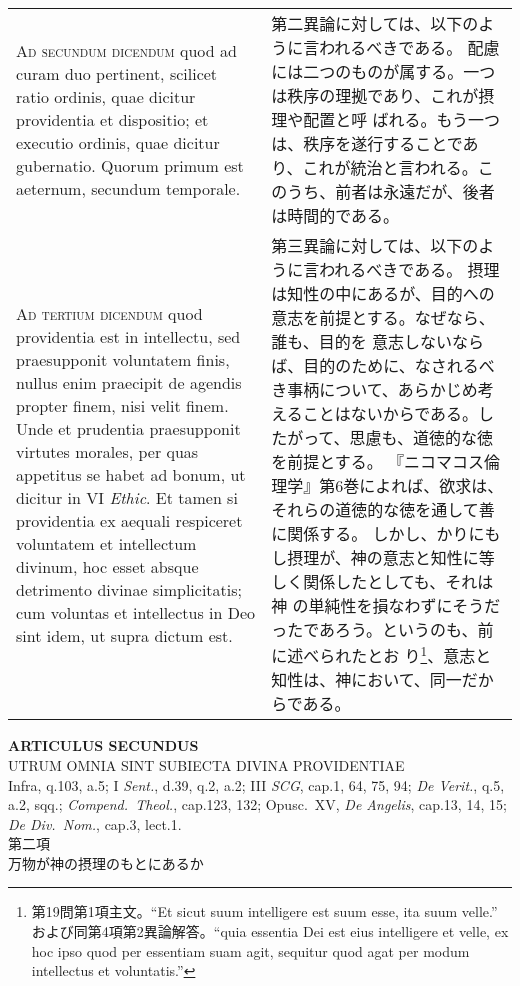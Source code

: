 \documentclass[10pt]{jsarticle} %
\begin{document}
\begin{longtable}{p{21em}p{21em}}
\\


{\scshape Ad secundum dicendum} quod ad curam duo
pertinent, scilicet ratio ordinis, quae dicitur providentia et
dispositio; et executio ordinis, quae dicitur gubernatio. Quorum primum
est aeternum, secundum temporale.


&

第二異論に対しては、以下のように言われるべきである。
配慮には二つのものが属する。一つは秩序の理拠であり、これが摂理や配置と呼
 ばれる。もう一つは、秩序を遂行することであり、これが統治と言われる。こ
 のうち、前者は永遠だが、後者は時間的である。


\\


{\scshape Ad tertium dicendum} quod providentia est in
intellectu, sed praesupponit voluntatem finis, nullus enim praecipit de
agendis propter finem, nisi velit finem. Unde et prudentia praesupponit
virtutes morales, per quas appetitus se habet ad bonum, ut dicitur in VI
{\itshape Ethic}. Et tamen si providentia ex aequali respiceret voluntatem et
intellectum divinum, hoc esset absque detrimento divinae simplicitatis;
cum voluntas et intellectus in Deo sint idem, ut supra dictum est.


&


第三異論に対しては、以下のように言われるべきである。
摂理は知性の中にあるが、目的への意志を前提とする。なぜなら、誰も、目的を
 意志しないならば、目的のために、なされるべき事柄について、あらかじめ考
 えることはないからである。したがって、思慮も、道徳的な徳を前提とする。
 『ニコマコス倫理学』第6巻によれば、欲求は、それらの道徳的な徳を通して善
 に関係する。
しかし、かりにもし摂理が、神の意志と知性に等しく関係したとしても、それは神
 の単純性を損なわずにそうだったであろう。というのも、前に述べられたとお
 り\footnote{第19問第1項主文。``Et sicut suum intelligere est suum esse,
 ita suum velle.'' および同第4項第2異論解答。``quia essentia Dei est eius intelligere et velle, ex hoc ipso quod per essentiam suam agit, sequitur quod agat per modum intellectus et voluntatis.''}、意志と知性は、神において、同一だからである。


\end{longtable}
\newpage

\begin{center}
 {\Large {\bf ARTICULUS SECUNDUS}}\\
 {\large UTRUM OMNIA SINT SUBIECTA DIVINA PROVIDENTIAE}\\
 {\footnotesize Infra, q.103, a.5; I {\itshape Sent.}, d.39, q.2, a.2;
 III {\itshape SCG}, cap.1, 64, 75, 94; {\itshape De Verit.}, q.5, a.2,
 sqq.; {\itshape Compend.~Theol.}, cap.123, 132; Opusc.~XV, {\itshape De
 Angelis}, cap.13, 14, 15; {\itshape De Div.~Nom.}, cap.3, lect.1.}\\
 {\Large 第二項\\万物が神の摂理のもとにあるか}
\end{center}
\end{document}
